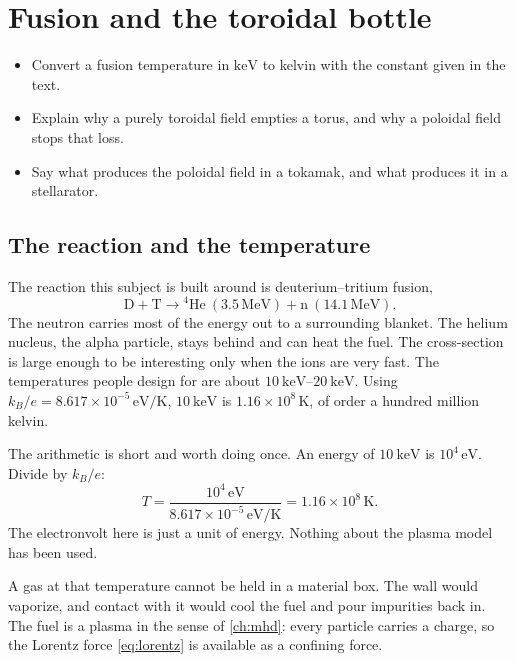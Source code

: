 \documentclass[11pt,a4paper,oneside,openany]{book}
\numberwithin{equation}{chapter}
\theoremstyle{definition}
\begin{document}
\chapter{Fusion and the toroidal bottle}
\label{ch:bottle}

\begin{objectives}
\begin{itemize}[leftmargin=1.2em]
\item Convert a fusion temperature in \(\mathrm{keV}\) to kelvin with the constant given in the text.
\item Explain why a purely toroidal field empties a torus, and why a poloidal field stops that loss.
\item Say what produces the poloidal field in a tokamak, and what produces it in a stellarator.
\end{itemize}
\end{objectives}

\section{The reaction and the temperature}

The reaction this subject is built around is deuterium--tritium fusion,
\begin{equation}
\label{eq:dt}
\mathrm{D}+\mathrm{T}\rightarrow {}^{4}\mathrm{He}\ (3.5\,\mathrm{MeV})+\mathrm{n}\ (14.1\,\mathrm{MeV}).
\end{equation}
The neutron carries most of the energy out to a surrounding blanket. The helium nucleus, the alpha particle, stays behind and can heat the fuel. The cross-section is large enough to be interesting only when the ions are very fast. The temperatures people design for are about \(\qtyrange{10}{20}{\kilo\electronvolt}\). Using \(k_{B}/e=8.617\times 10^{-5}\,\mathrm{eV/K}\), \(\qty{10}{\kilo\electronvolt}\) is \(1.16\times 10^{8}\,\mathrm{K}\), of order a hundred million kelvin.

The arithmetic is short and worth doing once. An energy of \(\qty{10}{\kilo\electronvolt}\) is \(10^{4}\,\mathrm{eV}\). Divide by \(k_{B}/e\):
\begin{equation}
\label{eq:temp}
T=\frac{10^{4}\,\mathrm{eV}}{8.617\times 10^{-5}\,\mathrm{eV/K}}=1.16\times 10^{8}\,\mathrm{K}.
\end{equation}
The electronvolt here is just a unit of energy. Nothing about the plasma model has been used.

A gas at that temperature cannot be held in a material box. The wall would vaporize, and contact with it would cool the fuel and pour impurities back in. The fuel is a plasma in the sense of \cref{ch:mhd}: every particle carries a charge, so the Lorentz force \eqref{eq:lorentz} is available as a confining force.
\end{document}
